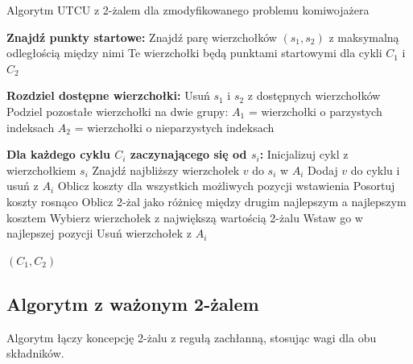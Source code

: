 \documentclass[12pt,a4paper]{article}
\begin{document}
\begin{algorithm}
\caption{Algorytm UTCU z 2-żalem dla zmodyfikowanego problemu komiwojażera}
\begin{algorithmic}[1]
\State \textbf{Znajdź punkty startowe:}
\State Znajdź parę wierzchołków $(s_1, s_2)$ z maksymalną odległością między nimi
\State Te wierzchołki będą punktami startowymi dla cykli $C_1$ i $C_2$

\State \textbf{Rozdziel dostępne wierzchołki:}
\State Usuń $s_1$ i $s_2$ z dostępnych wierzchołków
\State Podziel pozostałe wierzchołki na dwie grupy:
\State $A_1$ = wierzchołki o parzystych indeksach
\State $A_2$ = wierzchołki o nieparzystych indeksach

\State \textbf{Dla każdego cyklu $C_i$ zaczynającego się od $s_i$:}
\State Inicjalizuj cykl z wierzchołkiem $s_i$
\State Znajdź najbliższy wierzchołek $v$ do $s_i$ w $A_i$
\State Dodaj $v$ do cyklu i usuń z $A_i$
        \State Oblicz koszty dla wszystkich możliwych pozycji wstawienia
        \State Posortuj koszty rosnąco
        \State Oblicz 2-żal jako różnicę między drugim najlepszym a najlepszym kosztem
    \EndFor
    \State Wybierz wierzchołek z największą wartością 2-żalu
    \State Wstaw go w najlepszej pozycji
    \State Usuń wierzchołek z $A_i$
\EndWhile

\State \Return $(C_1, C_2)$
\end{algorithmic}
\end{algorithm}

\subsection{Algorytm z ważonym 2-żalem}
Algorytm łączy koncepcję 2-żalu z regułą zachłanną, stosując wagi dla obu składników.
\end{document}
